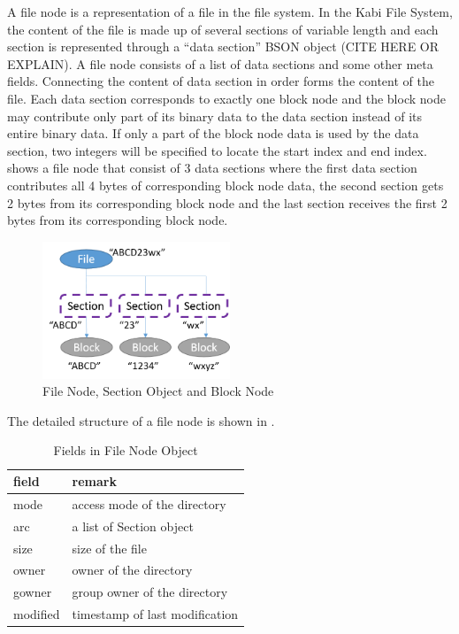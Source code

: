     A file node is a representation of a file in the file system. In the Kabi File System, the content of the file is made up of several sections of variable length and each section is represented through a ``data section'' BSON object (CITE HERE OR EXPLAIN). A file node consists of a list of data sections and some other meta fields. Connecting the content of data section in order forms the content of the file. Each data section corresponds to exactly one block node and the block node may contribute only part of its binary data to the data section instead of its entire binary data. If only a part of the block node data is used by the data section, two integers will be specified to locate the start index and end index.  shows a file node that consist of 3 data sections where the first data section contributes all 4 bytes of corresponding block node data, the second section gets 2 bytes from its corresponding block node and the last section receives the first 2 bytes from its corresponding block node.

\begin{figure}[hbtp]
\centering
\includegraphics[width=0.5\textwidth]{Chapter-3/figs/fig7.png}
\caption{File Node, Section Object and Block Node}
\label{fig:file_and_section}
\end{figure}

	The detailed structure of a file node is shown in .

\begin{table}
\caption{Fields in File Node Object}
\label{tab:file_fields}
\begin{center}
\begin{tabular}{ll}
\toprule
field & remark\\
\midrule
mode & access mode of the directory\\
arc & a list of Section object\\
size & size of the file\\
owner & owner of the directory\\
gowner & group owner of the directory\\
modified & timestamp of last modification\\
\bottomrule
\end{tabular}
\end{center}
\end{table}

